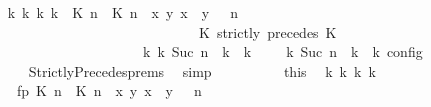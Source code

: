 \begin{isabellebody}
\ \ \ \ \ \ \ \ \isamarkupfalse%
\ {\isacartoucheopen}{\isasymexists}{\isasymGamma}\isactrlsub k\ {\isasymPsi}\isactrlsub k\ {\isasymPhi}\isactrlsub k\ k{\isachardot}\ {\isacharparenleft}{\isacharparenleft}{\isacharparenleft}{\isacharparenleft}{\isasymlceil}{\isacharhash}\isactrlsup {\isasymle}\ K\ n{\isacharcomma}\ {\isacharhash}\isactrlsup {\isacharless}\ K\ n{\isasymrceil}\ {\isasymin}\ {\isacharparenleft}{\isasymlambda}{\isacharparenleft}x{\isacharcomma}\ y{\isacharparenright}{\isachardot}\ x\ {\isasymle}\ y{\isacharparenright}{\isacharparenright}\ {\isacharhash}\ {\isasymGamma}{\isacharparenright}{\isacharcomma}\ n\isanewline
\ \ \ \ \ \ \ \ \ \ \ \ \ \ \ \ \ \ \ \ \ \ \ \ \ \ \ \ \ \ \ \ \ \ {\isasymturnstile}\ {\isasymPsi}\ {\isasymtriangleright}\ {\isacharparenleft}{\isacharparenleft}K\ strictly\ precedes\ K\ {\isacharhash}\ {\isasymPhi}{\isacharparenright}{\isacharparenright}\isanewline
\ \ \ \ \ \ \ \ \ \ \ \ \ \ \ \ \ \ \ \ \ \ \ \ \ \ \ \ \ {\isasymhookrightarrow}\isactrlbsup k\isactrlesup \ {\isacharparenleft}{\isasymGamma}\isactrlsub k{\isacharcomma}\ Suc\ n\ {\isasymturnstile}\ {\isasymPsi}\isactrlsub k\ {\isasymtriangleright}\ {\isasymPhi}\isactrlsub k{\isacharparenright}{\isacharparenright}\ {\isasymand}\ {\isacharparenleft}{\isasymrho}\ {\isasymin}\ {\isasymlbrakk}\ {\isasymGamma}\isactrlsub k{\isacharcomma}\ Suc\ n\ {\isasymturnstile}\ {\isasymPsi}\isactrlsub k\ {\isasymtriangleright}\ {\isasymPhi}\isactrlsub k\ {\isasymrbrakk}\isactrlsub c\isactrlsub o\isactrlsub n\isactrlsub f\isactrlsub i\isactrlsub g{\isacharparenright}{\isacartoucheclose}\isanewline
\ \ \ \ \ \ \ \ \ \ \isamarkupfalse%
\ \ StrictlyPrecedes{\isachardot}prems\ \isamarkupfalse%
\ simp\isanewline
\ \ \ \ \ \ \ \ \isamarkupfalse%
\ this\ \isamarkupfalse%
\ {\isasymGamma}\isactrlsub k\ {\isasymPsi}\isactrlsub k\ {\isasymPhi}\isactrlsub k\ k\isanewline
\ \ \ \ \ \ \ \ \ \ \ fp{\isacharcolon}{\isacartoucheopen}{\isacharparenleft}{\isacharparenleft}{\isacharparenleft}{\isasymlceil}{\isacharhash}\isactrlsup {\isasymle}\ K\ n{\isacharcomma}\ {\isacharhash}\isactrlsup {\isacharless}\ K\ n{\isasymrceil}\ {\isasymin}\ {\isacharparenleft}{\isasymlambda}{\isacharparenleft}x{\isacharcomma}\ y{\isacharparenright}{\isachardot}\ x\ {\isasymle}\ y{\isacharparenright}{\isacharparenright}\ {\isacharhash}\ {\isasymGamma}{\isacharparenright}{\isacharcomma}\ n\isanewline

\end{isabellebody}
